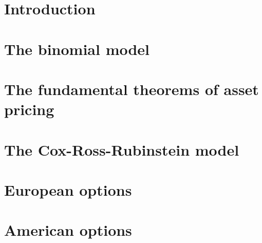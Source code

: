 \section{Introduction}
\label{sec:introduction}


\section{The binomial model}
\label{sec:binomial-model}


\section{The fundamental theorems of asset pricing}
\label{sec:FToAP}


\section{The Cox-Ross-Rubinstein model}
\label{sec:cox-ross-rubinstein}


\section{European options}
\label{sec:european-options}

\section{American options}
\label{sec:american-options}


